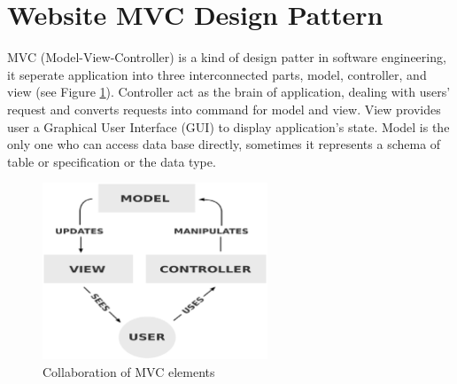 \section{Website MVC Design Pattern}
MVC (Model-View-Controller) is a kind of design patter in software engineering, it seperate application into three interconnected parts, model, controller, and view \cite{Leff2001} (see Figure \ref{fig:mvc}).
Controller act as the brain of application, dealing with users' request and converts requests into command for model and view.
View provides user a Graphical User Interface (GUI) to display application's state.
Model is the only one who can access data base directly, sometimes it represents a schema of table or specification or the data type.

\begin{figure}[H]
    \centering
    \includegraphics[width = 0.6\textwidth]{fig/mvc-relation.eps}
    \caption{Collaboration of MVC elements}
    \label{fig:mvc}
\end{figure}

